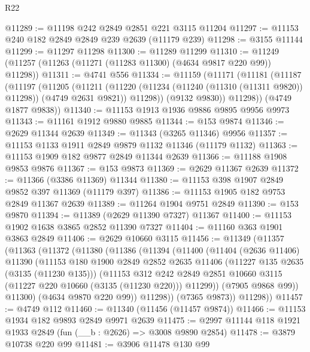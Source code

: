 \begin{lexlean}{R22}
\begin{coremodule}
@11289 := @11198 @242 @2849 @2851 @221 @3115 @11204
@11297 := @11153 @240 @182 @2849 @2849 @239 @2639 (@11179 @239)
@11298 := @3155 @11144
@11299 := @11297 @11298
@11300 := @11289 @11299
@11310 := @11249 (@11257 (@11263 (@11271 (@11283 @11300) (@4634 @9817 @220 @99)) @11298))
@11311 := @4741 @556
@11334 := @11159
    (@11171
      (@11181
        (@11187
          (@11197
            (@11205
              (@11211
                (@11220 (@11234 (@11240 (@11310 (@11311 @9820)) @11298)) (@4749 @2631 @9821))
                @11298))
            (@9132 @9830))
          @11298))
      (@4749 @1877 @9838))
@11340 := @11153 @1913 @1936 @9886 @9895 @9956 @9973
@11343 := @11161 @1912 @9880 @9885
@11344 := @153 @9874
@11346 := @2629 @11344 @2639
@11349 := @11343 (@3265 @11346) @9956
@11357 := @11153 @1133 @1911 @2849 @9879 @1132 @11346 (@11179 @1132)
@11363 := @11153 @1909 @182 @9877 @2849 @11344 @2639
@11366 := @11188 @1908 @9853 @9876
@11367 := @153 @9873
@11369 := @2629 @11367 @2639
@11372 := @11366 (@3386 @11369) @11344
@11380 := @11153 @398 @1907 @2849 @9852 @397 @11369 (@11179 @397)
@11386 := @11153 @1905 @182 @9753 @2849 @11367 @2639
@11389 := @11264 @1904 @9751 @2849
@11390 := @153 @9870
@11394 := @11389 (@2629 @11390 @7327) @11367
@11400 := @11153 @1902 @1638 @3865 @2852 @11390 @7327
@11404 := @11160 @363 @1901 @3863 @2849
@11406 := @2629 @10660 @3115
@11456 := @11349
    (@11357
      (@11363
        (@11372
          (@11380
            (@11386
              (@11394
                (@11400
                  (@11404
                    (@2636 @11406)
                    @11390
                    (@11153
                      @180
                      @1900
                      @2849
                      @2852
                      @2635
                      @11406
                      (@11227 @135 @2635 (@3135 (@11230 @135)))
                      (@11153
                        @312
                        @242
                        @2849
                        @2851
                        @10660
                        @3115
                        (@11227 @220 @10660 (@3135 (@11230 @220)))
                        @11299))
                    (@7905 @9868 @99))
                  @11300)
                (@4634 @9870 @220 @99))
              @11298))
          (@7365 @9873))
        @11298))
@11457 := @4749 @112
@11460 := @11340 (@11456 (@11457 @9874))
@11466 := @11153 @1934 @182 @9893 @2849 @9971 @2639
@11475 := @2997 @11144 @118 @1921 @1933 @2849 (fun (__b : @2626) => @3008 @9890 @2854)
@11478 := @3879 @10738 @220 @99
@11481 := @3906 @11478 @130 @99

\end{coremodule}
\end{lexlean}
